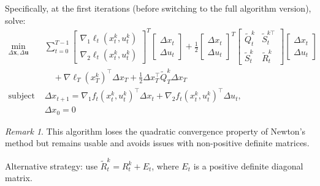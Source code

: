 \documentclass[openany]{book}
\theoremstyle{definition}
\theoremstyle{remark}
\newtheorem*{remark}{Remark}
\begin{document}
Specifically, at the first iterations (before switching to the full algorithm version), solve:
\begin{align*}
    \min_{\Delta\mathbf{x},\Delta\mathbf{u}} &\sum_{t=0}^{T-1} \begin{bmatrix}
        \nabla_1\ell_t(x_t^k, u_t^k) \\
        \nabla_2\ell_t(x_t^k, u_t^k)
    \end{bmatrix}^T \begin{bmatrix}
        \Delta x_t \\ \Delta u_t
    \end{bmatrix} + \frac{1}{2}\begin{bmatrix}
        \Delta x_t \\ \Delta u_t
    \end{bmatrix}^T \begin{bmatrix}
        \tilde{Q}_t^k & \tilde{S}_t^{k\top} \\
        \tilde{S}_t^k & \tilde{R}_t^k
    \end{bmatrix}\begin{bmatrix}
        \Delta x_t \\ \Delta u_t
    \end{bmatrix} \\
    &\quad + \nabla\ell_T(x_T^k)^\top \Delta x_T + \frac{1}{2}\Delta x_T^\top\tilde{Q}_T^k\Delta x_T\\
    \text{subject to } & \Delta x_{t+1} = \nabla_1f_t(x_t^k, u_t^k)^\top \Delta x_t + \nabla_2f_t(x_t^k, u_t^k)^\top \Delta u_t,\\
    & \Delta x_0 = 0
\end{align*}

\begin{remark}
This algorithm loses the quadratic convergence property of Newton's method but remains usable and avoids issues with non-positive definite matrices.
\end{remark}

Alternative strategy: use $\tilde{R}_t^k = R_t^k + E_t$, where $E_t$ is a positive definite diagonal matrix.
\end{document}
